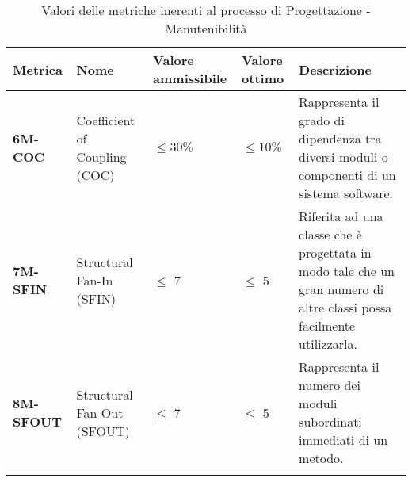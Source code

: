 \begin{longtable}{|>{\centering\arraybackslash}p{}|>{\centering\arraybackslash}p{}|>{\centering\arraybackslash}p{}|>{\centering\arraybackslash}p{}|>{\centering\arraybackslash}p{}|}
	\hline
	\textbf{Metrica}  & \textbf{Nome}                 & \textbf{Valore ammissibile} & \textbf{Valore ottimo} & \textbf{Descrizione}                                                                                                  \\
	\hline
	\endfirsthead
	\hline
	\textbf{6M-COC}   & Coefficient of Coupling (COC) & $\leq 30\% $                & $\leq 10\% $           & Rappresenta il grado di dipendenza tra diversi moduli o componenti di un sistema software.                            \\
	\hline
	\textbf{7M-SFIN}  & Structural Fan-In (SFIN)      & $\leq$ 7                    & $\le$ 5                & Riferita ad una classe che è progettata in modo tale che un gran numero di altre classi possa facilmente utilizzarla. \\
	\hline
	\textbf{8M-SFOUT} & Structural Fan-Out (SFOUT)    & $\leq$ 7                    & $\le$ 5                & Rappresenta il numero dei moduli subordinati immediati di un metodo.                                                  \\
	\hline
	\caption{Valori delle metriche inerenti al processo di Progettazione - Manutenibilità}
	\label{table:3}
\end{longtable}

